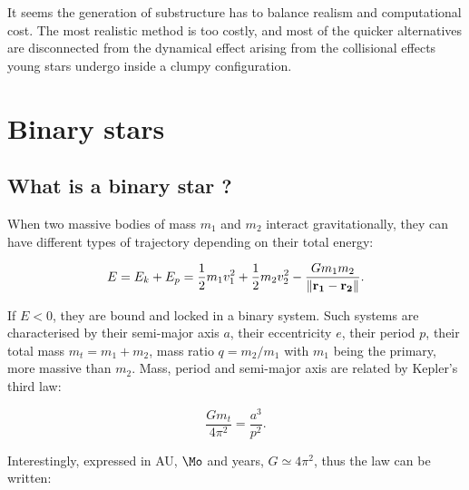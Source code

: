 It seems the generation of substructure has to balance realism and computational cost. The most realistic method is too costly, and most of the quicker alternatives are disconnected from the dynamical effect arising from the collisional effects young stars undergo inside a clumpy configuration.



\section{Binary stars}

\subsection{What is a binary star ?}

When two massive bodies of mass $m_1$ and $m_2$ interact gravitationally, they can have different types of trajectory depending on their total energy:

\begin{equation}
E = E_k + E_p = \frac{1}{2} m_1 v_1^2 + \frac{1}{2} m_2 v_2^2  - \frac{G m_1 m_2}{\| \bold{r_1} - \bold{r_2}\| }.
\end{equation}


If $E<0$, they are bound and locked in a binary system. Such systems are characterised by their semi-major axis $a$, their eccentricity $e$, their period $p$, their total mass $m_t = m_1 + m_2$, mass ratio $q = m_2/m_1$ with $m_1$ being the primary, more massive than $m_2$.
Mass, period and semi-major axis are related by Kepler's third law:

\begin{equation}
\frac{G m_t}{4\pi^2} =  \frac{a^3}{p^2}.
\end{equation}

Interestingly, expressed in AU, $\Mo$ and years, $G \simeq 4 \pi^2$, thus the law can be written:

